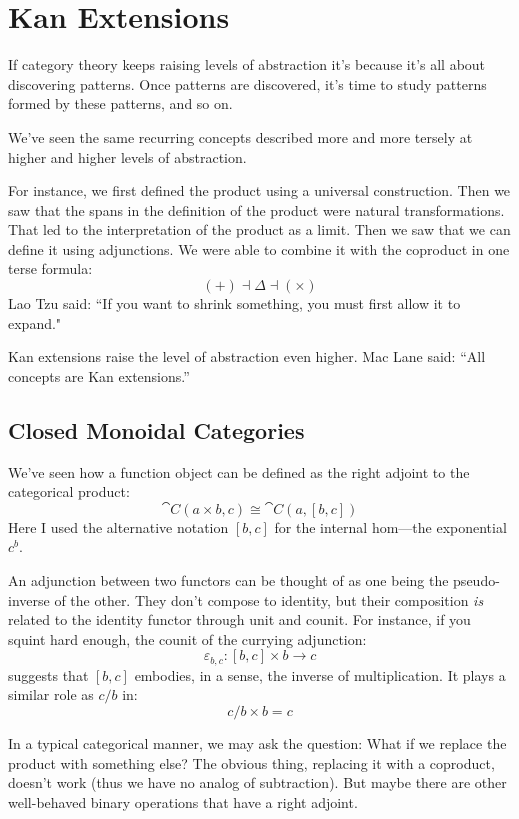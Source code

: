 \documentclass[DaoFP]{subfiles}
\begin{document}
\setcounter{chapter}{18}

\chapter{Kan Extensions}

If category theory keeps raising levels of abstraction it's because it's all about discovering patterns. Once patterns are discovered, it's time to study patterns formed by these patterns, and so on. 

We've seen the same recurring concepts described more and more tersely at higher and higher levels of abstraction. 

For instance, we first defined the product using a universal construction. Then we saw that the spans in the definition of the product were natural transformations. That led to the interpretation of the product as a limit. Then we saw that we can define it using adjunctions. We were able to combine it with the coproduct in one terse formula:
\[ (+) \dashv \Delta \dashv (\times) \]
Lao Tzu said: ``If you want to shrink something, you must first allow it to expand."

Kan extensions raise the level of abstraction even higher. Mac Lane said: ``All concepts are Kan extensions.''

\section{Closed Monoidal Categories}

We've seen how a function object can be defined as the right adjoint to the categorical product:
\[ \cat C (a \times b, c) \cong \cat C (a, [b, c]) \]
Here I used the alternative notation $[b, c]$ for the internal hom---the exponential $c^b$. 

An adjunction between two functors can be thought of as one being the pseudo-inverse of the other. They don't compose to identity, but their composition \emph{is} related to the identity functor through unit and counit. For instance, if you squint hard enough, the counit of the currying adjunction:
\[ \varepsilon_{b, c} \colon [b, c] \times b \to c \]
suggests that $[b, c]$ embodies, in a sense, the inverse of multiplication. It plays a similar role as $c/b$ in:
\[ c/b \times b = c \]

In a typical categorical manner, we may ask the question: What if we replace the product with something else? The obvious thing, replacing it with a coproduct, doesn't work (thus we have no analog of subtraction). But maybe there are other well-behaved binary operations that have a right adjoint.
\end{document}
